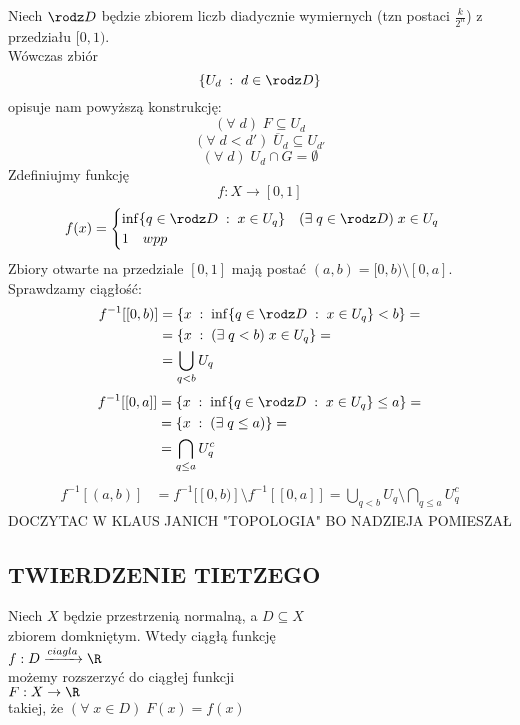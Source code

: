 Niech $\rodz D$ będzie zbiorem liczb diadycznie wymiernych (tzn postaci $\frac k{2^n}$) z przedziału $[0, 1)$. \\Wówczas zbiór
$$\{U_d\;:\;d\in \rodz D\}$$
opisuje nam powyższą konstrukcję:
$$(\forall\;d)\;F\subseteq U_d$$
$$(\forall\;d<d')\;\overline U_d\subseteq U_{d'}$$
$$(\forall\;d)\;U_d\cap G=\emptyset$$
Zdefiniujmy funkcję
$$f:X\to [0,1]$$
$$f(x)=\begin{cases}\inf\{q\in\rodz D\;:\;x\in U_q\}\quad (\exists\;q\in\rodz D)\;x\in U_q\\1\quad wpp\end{cases}$$
Zbiory otwarte na przedziale $[0,1]$ mają postać $(a, b)=[0,b)\setminus[0,a]$. Sprawdzamy ciągłość:
\begin{align*}
    f^{-1}[[0,b)] &= \{x\;:\;\inf\{q\in\rodz D\;:\;x\in U_q\}<b\}=\\
                  &=\{x\;:\;(\exists\;q<b)\;x\in U_q\}=\\
                  &=\bigcup\limits_{q<b}U_q
\end{align*}
\begin{align*}
    f^{-1}[[0,a]] &= \{x\;:\;\inf\{q\in\rodz D\;:\;x\in U_q\}\leq a\}=\\
                  &= \{x\;:\;(\exists\;q\leq a)\}=\\
                  &=\bigcap\limits_{q\leq a}U_q^c
\end{align*}
\begin{align*}
    f^{-1}[(a,b)]&=f^{-1}[[0,b)]\setminus f^{-1}[[0, a]] = \bigcup\limits_{q<b}U_q\setminus\bigcap\limits_{q\leq a}U_q^c
\end{align*}
{\large\color{def}DOCZYTAC W KLAUS JANICH "TOPOLOGIA" BO NADZIEJA POMIESZAŁ}

\subsection{TWIERDZENIE TIETZEGO}
\begin{center}\large
    Niech $X$ będzie przestrzenią normalną, a $D\subseteq X$ \\zbiorem domkniętym. Wtedy ciągłą funkcję \smallskip\\
    $f:D\xrightarrow{ciagla} \R$\smallskip\\
    możemy rozszerzyć do ciągłej funkcji\smallskip\\
    $F:X\to \R$\smallskip\\
    takiej, że $(\forall\;x\in D)\;F(x)=f(x)$
\end{center}
